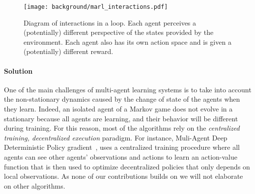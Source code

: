 \begin{figure}[!h]
\centering
\texttt{[image: background/marl\_interactions.pdf]}	
\caption{Diagram of interactions in a \marl loop. Each agent perceives a (potentially) different perspective of the states provided by the environment. Each agent also has its own action space and is given a (potentially) different reward.}
\label{fig:marl_interactions}
\end{figure}

\paragraph{Solution}

One of the main challenges of multi-agent learning systems is to take into account the non-stationary dynamics caused by the change of state of the agents when they learn. Indeed, an isolated agent of a Markov game does not evolve in a stationary \mdp because all agents are learning, and their behavior will be different during training. For this reason, most of the \marl algorithms rely on the \textit{centralized training, decentralized execution} paradigm. For instance, Muli-Agent Deep Deterministic Policy gradient~\citep{lowe2017multi}, uses a centralized training procedure where all agents can see other agents' observations and actions to learn an action-value function that is then used to optimize decentralized policies that only depends on local observations. As none of our contributions builds on \marl we will not elaborate on other \marl algorithms.






